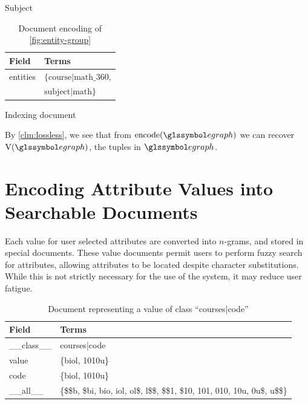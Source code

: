 \begin{ex}
\begin{table}
\begin{subtable}[b]{0.33\linewidth}
					\caption{Subject}
				\end{subtable}
				\begin{subtable}[b]{0.33\linewidth}
					\centering
					
					\begin{tabular}{ll}
						\toprule
						Field & Terms \\
						\midrule
						entities & \(\{\text{course|math\_360}\), \\
						& \(\text{subject|math}\}\) \\
						\bottomrule
					\end{tabular}
					
					\caption{Indexing document}
				\end{subtable}
				
				\caption{Document encoding of \cref{fig:entity-group}}
				\label{tbl:document-encoding}
			\end{table}
		\end{ex}
		
		By \cref{clm:lossless}, we see that from \(\text{encode}(\egraph)\) we can recover \(\text{V}(\egraph)\), the tuples in \(\egraph\).
	
	\section{Encoding Attribute Values into Searchable Documents}
		Each value for user selected attributes are converted into \(n\)-grams, and stored in special documents.  These value documents permit users to perform fuzzy search for attributes, allowing attributes to be located despite character substitutions.  While this is not strictly necessary for the use of the system, it may reduce user fatigue.
		
		\begin{table}
			\centering
			\begin{tabular}{ll}
				\toprule
				Field & Terms \\
				\midrule
				\_\_class\_\_ & courses|code \\
				value & \{biol, 1010u\} \\
				code & \{biol, 1010u\} \\
				\_\_all\_\_ & \{\$\$b, \$bi, bio, iol, ol\$, l\$\$, \$\$1, \$10, 101, 010, 10u, 0u\$, u\$\$\} \\
				\bottomrule
			\end{tabular}
			
			\caption{Document representing a value of class ``courses|code''}
			\label{tbl:value-document}
		\end{table}
		
